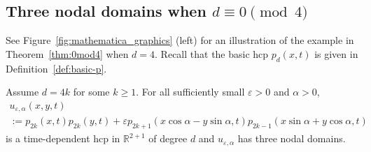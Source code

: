 \documentclass[AHL,Unicode,longabstracts,published]{cedram}
\newcommand{\R}{\mathbb{R}}
\renewcommand{\epsilon}{\varepsilon}
\newcommand{\R}{\mathbb{R}}
\begin{document}
\subsection{Three nodal domains when \texorpdfstring{$d \equiv 0 \pmod 4$}{d is not congruent to 0 mod~4}}\label{subsec:0mod4}

See Figure~\ref{fig:mathematica_graphics} (left) for an illustration of the example in Theorem~\ref{thm:0mod4} when $d=4$. {Recall that the basic hcp $p_d(x,t)$ is given in Definition~\ref{def:basic-p}.}


\begin{theo}\label{thm:0mod4}
Assume $d=4k$ for some $k\geq 1$. For all sufficiently small $\epsilon > 0$ and $\alpha >0$,
\begin{multline}\label{eqn:u_0_mod_4}
u_{\epsilon,\alpha}(x,y,t)\\
:= p_{2k}(x,t)p_{2k}(y,t) + \epsilon p_{2k+1}(x\cos\alpha-y\sin\alpha,t)p_{2k-1}(x\sin\alpha+y\cos\alpha,t)
\end{multline}
is a time-dependent hcp in $\R^{2+1}$ of degree $d$ and $u_{\epsilon,\alpha}$ has three nodal domains.
\end{theo}
\end{document}
